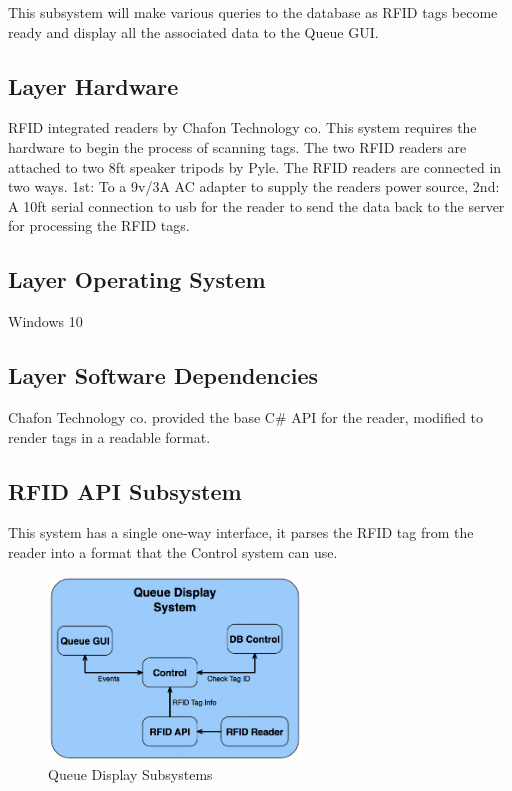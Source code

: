 	This subsystem will make various queries to the database as RFID tags become ready and display
all the associated data to the Queue GUI.

\subsection{Layer Hardware}
RFID integrated readers by Chafon Technology co. This system requires the hardware to begin the process of scanning tags. The two RFID readers are attached to two 8ft speaker tripods by Pyle. The RFID readers are connected in two ways. 1st: To a 9v/3A AC adapter to supply the readers power source,  2nd: A 10ft serial connection to usb for the reader to send the data back to the server for processing the RFID tags. 

\subsection{Layer Operating System}
Windows 10 

\subsection{Layer Software Dependencies}
Chafon Technology co. provided the base C\# API for the reader, modified to render tags in a readable format. 

\subsection{RFID API Subsystem}
This system has a single one-way interface, it parses the RFID tag from the reader into a format
that the Control system can use.

\begin{figure}[h!]
	\centering
 	\includegraphics[width=0.60\textwidth]{images/ads_4}
 \caption{Queue Display Subsystems}
\end{figure}

